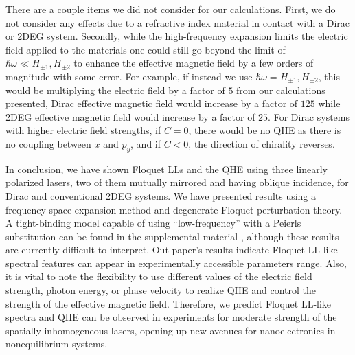 \documentclass[aps,prb,twocolumn,showpacs,superscriptaddress]{revtex4-2}
\begin{document}
There are a couple items we did not consider for our calculations.
First, we do not consider any effects due to a refractive index material in contact with a Dirac or 2DEG system.
Secondly, while the high-frequency expansion limits the electric field applied to the materials one could still go beyond the limit of $\hbar \omega \ll H_{\pm 1}, H_{\pm2}$ to enhance the effective magnetic field by a few orders of magnitude with some error.
For example, if instead we use $\hbar\omega = H_{\pm1}, H_{\pm2}$, this would be multiplying the electric field by a factor of $5$ from our calculations presented, Dirac effective magnetic field would increase by a factor of $125$ while 2DEG effective magnetic field would increase by a factor of $25$.
For Dirac systems with higher electric field strengths, if $C=0$, there would be no QHE as there is no coupling between $x$ and $p_y$, and if $C<0$, the direction of chirality reverses.

In conclusion, we have shown Floquet LLs and the QHE using three linearly polarized lasers, two of them mutually mirrored and having oblique incidence, for Dirac and conventional 2DEG systems.
We have presented results using a frequency space expansion method and degenerate Floquet perturbation theory.
A tight-binding model capable of using ``low-frequency'' with a Peierls substitution can be found in the supplemental material \cite{supp}, although these results are currently difficult to interpret.
Out paper's results indicate Floquet LL-like spectral features can appear in experimentally accessible parameters range.
Also, it is vital to note the flexibility to use different values of the electric field strength, photon energy, or phase velocity to realize QHE and control the strength of the effective magnetic field.
Therefore, we predict Floquet LL-like spectra and QHE can be observed in experiments for moderate strength of the spatially inhomogeneous lasers, opening up new avenues for nanoelectronics in nonequilibrium systems.


\end{document}
